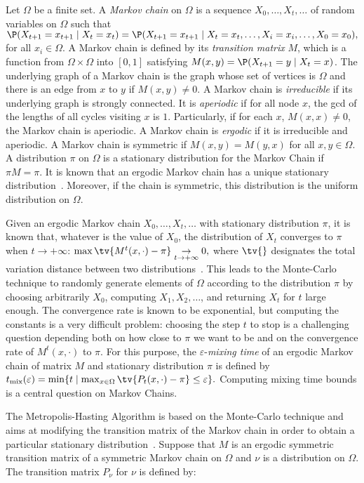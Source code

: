 Let $\Omega$ be a finite set. A {\it Markov chain} on $\Omega$ is a sequence
$X_0,\ldots,X_t,\ldots$ of random variables on $\Omega$ such that
$\P(X_{t+1}=x_{t+1}\mid X_t=x_t)=\P(X_{t+1}=x_{t+1}\mid
X_t=x_t,\ldots,X_i=x_i,\ldots,X_0=x_0),$ for all $x_i\in\Omega$. A Markov
chain is defined by its {\it transition matrix} $M$, which is a function
from $\Omega\times\Omega$ into $[0,1]$ satisfying $M(x,y)=\P(X_{t+1}=y \mid
X_t=x)$. The underlying graph of a Markov chain is the graph whose set of
vertices is $\Omega$ and there is an edge from $x$ to $y$ if $M(x,y)\neq 0$.
A Markov chain is {\it irreducible} if its underlying graph is strongly
connected. It is {\it aperiodic} if for all node $x$, the gcd of the lengths
of all cycles visiting $x$ is $1$. Particularly, if for each $x$, $M(x,x)\neq
0$, the Markov chain is aperiodic. A Markov chain is {\it ergodic} if it is
irreducible and aperiodic. A Markov chain is symmetric if $M(x,y)=M(y,x)$
for all $x,y\in\Omega$. A distribution $\pi$ on $\Omega$ is a stationary
distribution for the Markov Chain if $\pi M =\pi$. It is known that an
ergodic Markov chain has a unique stationary
distribution~\cite[Chapter~1]{mixing}. Moreover, if the chain is symmetric,
this distribution is the uniform distribution on $\Omega$.

Given an ergodic Markov chain $X_0,\ldots,X_t,\ldots$ with stationary
distribution $\pi$, it is known that, whatever is the value of $X_0$, the
distribution of $X_t$ converges to $\pi$ when $t\to +\infty$:
$\max \tv{M^t(x,\cdot)-\pi}\underset{t\to +\infty}{\to} 0,$ where $\tv{}$
designates the total variation distance between two
distributions~\cite[Chapter~4]{mixing}. This leads to the Monte-Carlo
technique to randomly generate elements of $\Omega$ according to the
distribution $\pi$ by choosing arbitrarily $X_0$, computing $X_1,X_2,\ldots$, and
returning $X_t$ for $t$ large enough. The convergence rate is known to be
exponential, but computing the constants is a very difficult problem: choosing
the step $t$ to stop is a challenging question depending both on how close to
$\pi$ we want to be and on the convergence rate of $M^t(x,\cdot)$ to $\pi$.
For this purpose, the $\varepsilon$-{\it mixing time} of an ergodic Markov
chain of matrix $M$ and stationary distribution $\pi$ is defined by $t_{\rm
mix}(\varepsilon)= \min \{t\mid \max_{x\in \Omega}\tv{P_t(x,\cdot)-\pi}\leq \varepsilon\}.$
Computing mixing time bounds is a central question on Markov Chains.

The Metropolis-Hasting Algorithm is based on the Monte-Carlo technique and
aims at modifying the transition matrix of the Markov chain in order to
obtain a particular stationary distribution~\cite[Chapter 3]{mixing}.
Suppose that $M$ is an ergodic symmetric transition matrix of a symmetric
Markov chain on $\Omega$ and $\nu$ is a distribution on $\Omega$. The
transition matrix $P_\nu$ for $\nu$ is defined by:

